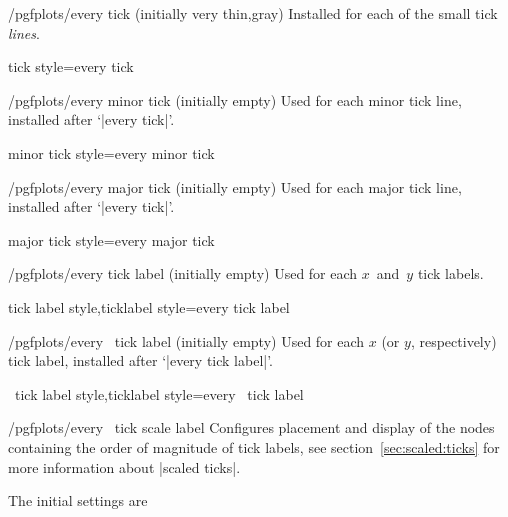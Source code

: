 \begin{stylekey}{/pgfplots/every tick (initially very thin,gray)}
 Installed for each of the small tick \emph{lines}.
\end{stylekey}

\pgfplotsshortstylekey tick style=every tick\pgfeov

\begin{stylekey}{/pgfplots/every minor tick  (initially empty)}
 Used for each minor tick line, installed after `|every tick|'.
\end{stylekey}

\pgfplotsshortstylekey minor tick style=every minor tick\pgfeov

\begin{stylekey}{/pgfplots/every major tick (initially empty)}
 Used for each major tick line, installed after `|every tick|'.
\end{stylekey}

\pgfplotsshortstylekey major tick style=every major tick\pgfeov

\begin{stylekey}{/pgfplots/every tick label (initially empty)}
 Used for each $x$~and~$y$ tick labels.
\end{stylekey}

\pgfplotsshortxystylekeys tick label style,ticklabel style=every tick label\pgfeov

\begin{xystylekey}{/pgfplots/every \x\ tick label (initially empty)}
 Used for each $x$ (or $y$, respectively) tick label, installed after `|every tick label|'.
\end{xystylekey}

\pgfplotsshortxystylekeys \x\ tick label style,\x ticklabel style=every \x\ tick label\pgfeov

\begin{xystylekey}{/pgfplots/every \x\ tick scale label}
 Configures placement and display of the nodes containing the order of magnitude of tick labels, see section~\ref{sec:scaled:ticks} for more information about |scaled ticks|.

The initial settings are
\begin{codeexample}
\end{codeexample}
\end{xystylekey}

